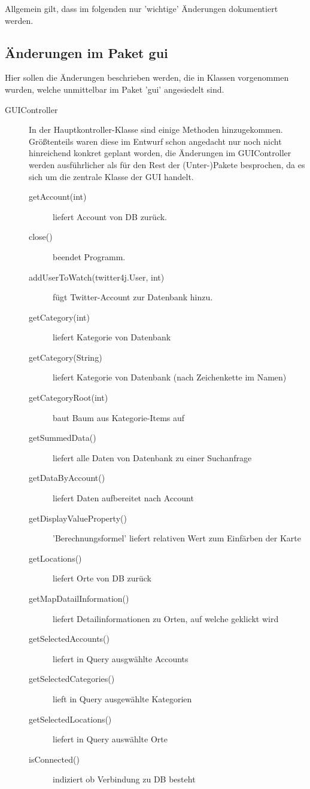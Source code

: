 	Allgemein gilt, dass im folgenden nur 'wichtige' Änderungen dokumentiert werden.
\subsection{Änderungen im Paket gui}
	Hier sollen die Änderungen beschrieben werden, die in Klassen vorgenommen wurden, welche unmittelbar im Paket 'gui' angesiedelt sind.
	\begin{description}
		\item [GUIController] 
		\quad 
		In der Hauptkontroller-Klasse sind einige Methoden hinzugekommen. Größtenteils waren diese im Entwurf schon angedacht nur noch nicht hinreichend konkret geplant worden, die Änderungen im GUIController werden ausführlicher als für den Rest der (Unter-)Pakete besprochen, da es sich um die zentrale Klasse der GUI handelt.
		\begin{description}
			\item[getAccount(int)] liefert Account von DB zurück.
			\item[close()] beendet Programm.
			\item[addUserToWatch(twitter4j.User, int)] fügt Twitter-Account zur Datenbank hinzu.
			\item[getCategory(int)] liefert Kategorie von Datenbank
			\item[getCategory(String)] liefert Kategorie von Datenbank (nach Zeichenkette im Namen)
			\item[getCategoryRoot(int\text{[]})] baut Baum aus Kategorie-Items auf
			\item[getSummedData()] liefert alle Daten von Datenbank zu einer Suchanfrage
			\item[getDataByAccount()] liefert Daten aufbereitet nach Account
			\item[getDisplayValueProperty()] 'Berechnungsformel' liefert relativen Wert zum Einfärben der Karte
			\item[getLocations()] liefert Orte von DB zurück
			\item[getMapDatailInformation()] liefert Detailinformationen zu Orten, auf welche geklickt wird
			\item[getSelectedAccounts()] liefert in Query ausgwählte Accounts
			\item[getSelectedCategories()] lieft in Query ausgewählte Kategorien
			\item[getSelectedLocations()] liefert in Query auswählte Orte
			\item[isConnected()] indiziert ob Verbindung zu DB besteht

\end{description}
\end{description}
